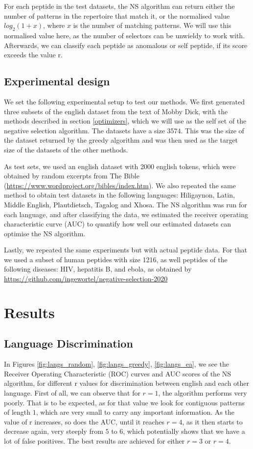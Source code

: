 \documentclass{article}
\begin{document}
For each peptide in the test datasets, the NS algorithm can return either the number of patterns in the repertoire that 
match it, or the normalised value $log_2(1 + x)$, where $x$ is the number of matching patterns. We will use this 
normalised value here, as the number of selectors can be unwieldy to work with. Afterwards, we can classify each peptide 
as anomalous or self peptide, if its score exceeds the value r.

\subsection{Experimental design}
We set the following experimental setup to test our methods. We first generated three subsets of the english dataset 
from the text of Mobby Dick, with the methods described in section \ref{optimizers}, which we will use as the self set of 
the negative selection algorithm. The datasets have a size 3574. This was the size of the dataset returned by the greedy 
algorithm and was then used as the target size of the datasets of the other methods.

As test sets, we used an english dataset with 2000 english tokens, which were obtained by random excerpts from The Bible (\url{https://www.wordproject.org/bibles/index.htm}).
We also repeated the same method to obtain test datasets in the following languages: Hiligaynon, Latin, Middle English, 
Plautdietsch, Tagalog and Xhosa. The NS algorithm was run for each language, and after classifying the data, we 
estimated the receiver operating characteristic curve (AUC) to quantify how well our estimated datasets can optimise 
the NS algorithm.

Lastly, we repeated the same experiments but with actual peptide data. For that we used a subset of human peptides with 
size 1216, as well peptides of the following diseases: HIV, hepatitis B, and ebola, as obtained by \url{https://github.com/ingewortel/negative-selection-2020}



\section{Results}
\subsection{Language Discrimination}
In Figures \ref{fig:langs_random}, \ref{fig:langs_greedy}, \ref{fig:langs_ea}, we see the Receiver Operating 
Characteristic (ROC) curves and AUC scores of the NS algorithm, for different r values for discrimination between
english and each other language. First of all, we can observe that for $r=1$, the algorithm performs very poorly. That 
is to be expected, as for that value we look for contiguous patterns of length $1$, which are very small to carry any 
important information. As the value of r increases, so does the AUC, until it reaches $r=4$, as it then starts to 
decrease again, very steeply from $5$ to $6$, which potentially shows that we have a lot of false positives. The best 
results are achieved for either $r=3$ or $r=4$.
\end{document}
